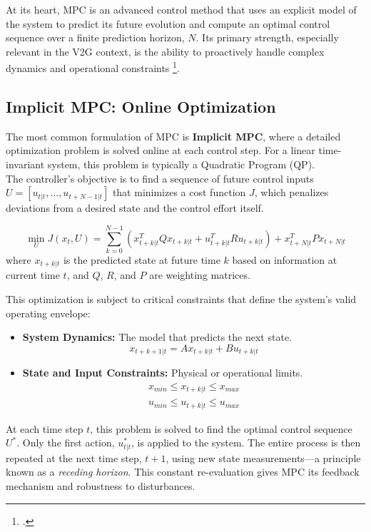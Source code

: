 At its heart, MPC is an advanced control method that uses an explicit model of the system to predict its future evolution and compute an optimal control sequence over a finite prediction horizon, $N$. Its primary strength, especially relevant in the V2G context, is the ability to proactively handle complex dynamics and operational constraints \footcite{minchala2025systematic}.

\subsection{Implicit MPC: Online Optimization}
The most common formulation of MPC is \textbf{Implicit MPC}, where a detailed optimization problem is solved online at each control step. For a linear time-invariant system, this problem is typically a Quadratic Program (QP).
\\
\noindent
The controller's objective is to find a sequence of future control inputs $U = [u_{t|t}, ..., u_{t+N-1|t}]$ that minimizes a cost function $J$, which penalizes deviations from a desired state and the control effort itself.

\begin{equation}
\min_{U} J(x_t, U) = \sum_{k=0}^{N-1} (x_{t+k|t}^T Q x_{t+k|t} + u_{t+k|t}^T R u_{t+k|t}) + x_{t+N|t}^T P x_{t+N|t}
\end{equation}
where $x_{t+k|t}$ is the predicted state at future time $k$ based on information at current time $t$, and $Q$, $R$, and $P$ are weighting matrices.

\noindent
This optimization is subject to critical constraints that define the system's valid operating envelope:
\begin{itemize}
    \item \textbf{System Dynamics:} The model that predicts the next state.
    \begin{equation}
    x_{t+k+1|t} = A x_{t+k|t} + B u_{t+k|t}
    \end{equation}
    \item \textbf{State and Input Constraints:} Physical or operational limits.
    \begin{gather}
    x_{min} \le x_{t+k|t} \le x_{max} \\
    u_{min} \le u_{t+k|t} \le u_{max}
    \end{gather}
\end{itemize}
At each time step $t$, this problem is solved to find the optimal control sequence $U^*$. Only the first action, $u_{t|t}^*$, is applied to the system. The entire process is then repeated at the next time step, $t+1$, using new state measurements—a principle known as a \textit{receding horizon}. This constant re-evaluation gives MPC its feedback mechanism and robustness to disturbances.

